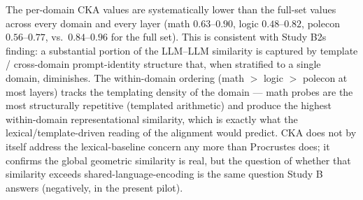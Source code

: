 The per-domain CKA values are systematically lower than the full-set
values across every domain and every layer (math $0.63$--$0.90$, logic
$0.48$--$0.82$, polecon $0.56$--$0.77$, vs.\ $0.84$--$0.96$ for the
full set). This is consistent with Study B2s finding: a substantial
portion of the LLM--LLM similarity is captured by template /
cross-domain prompt-identity structure that, when stratified to a
single domain, diminishes. The within-domain ordering (math $>$ logic
$>$ polecon at most layers) tracks the templating density of the
domain --- math probes are the most structurally repetitive (templated
arithmetic) and produce the highest within-domain representational
similarity, which is exactly what the lexical/template-driven reading
of the alignment would predict. CKA does not by itself address the
lexical-baseline concern any more than Procrustes does; it confirms
the global geometric similarity is real, but the question of whether
that similarity exceeds shared-language-encoding is the same question
Study B answers (negatively, in the present pilot).
